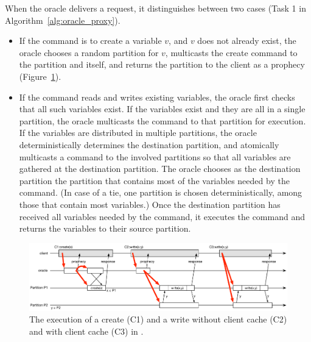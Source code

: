When the oracle delivers a request, it distinguishes between two cases (Task 1 in Algorithm~\ref{alg:oracle_proxy}).
\begin{itemize}
\item If the command is to create a variable $v$, and $v$ does not already exist, the oracle chooses a random partition for $v$, multicasts the create command to the partition and itself, and returns the partition to the client as a prophecy (Figure~\ref{fig:oracle_repartition}).
\item If the command reads and writes existing variables, the oracle first checks that all such variables exist.
If the variables exist and they are all in a single partition, the oracle multicasts the command to that partition for execution.
If the variables are distributed in multiple partitions, the oracle deterministically determines the destination partition, and atomically multicasts a command to the involved partitions so that all variables are gathered at the destination partition.
The oracle chooses as the destination partition the partition that contains most of the variables needed by the command.
(In case of a tie, one partition is chosen deterministically, among those that contain most variables.)
Once the destination partition has received all variables needed by the command, it executes the command and returns the variables to their source partition.

\end{itemize}






\begin{figure}
\begin{minipage}[b]{1\linewidth} %
\centering
      \includegraphics[width=0.9\linewidth]{figures/dynastar}
\end{minipage}
\caption{The execution of a create (C1) and a write without client cache (C2) and with client cache (C3) in \dynastar.}
\label{fig:oracle_repartition}
\end{figure}

